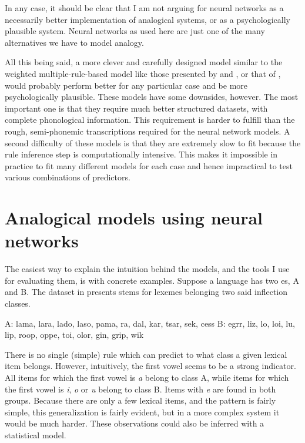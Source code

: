 In any case, it should be clear that I am not arguing for neural networks as a necessarily better implementation of analogical systems, or as a psychologically plausible system. Neural networks as used here are just one of the many alternatives we have to model analogy.

All this being said, a more clever and carefully designed model similar to the weighted multiple-rule-based model like those presented by \textcite{Albright.2003} and \textcite{Albright.2009}, or that of \textcite{Beniamine.2016}, would probably perform better for any particular case and be more psychologically plausible. These models have some downsides, however. The most important one is that they require much better structured datasets, with complete phonological information. This requirement is harder to fulfill than the rough, semi-phonemic transcriptions required for the neural network models. A second difficulty of these models is that they are extremely slow to fit because the rule inference step is computationally intensive. This makes it impossible in practice to fit many different models for each case and hence impractical to test various combinations of predictors.

\section{Analogical models using neural networks}

The easiest way to explain the intuition behind the models, and the tools I use for evaluating them, is with concrete examples. Suppose a language has two es, A and B. The dataset in  presents stems for lexemes belonging two said inflection classes.

\begin{exe}
    \ex  \label{exe-inflect-1}
    \begin{xlist}
        \ex A: lama, lara, lado, laso, pama, ra, dal, kar, tsar, sek, cess
        \ex B: egrr, liz, lo, loi, lu, lip, roop, oppe, toi, olor, gin, grip, wik
    \end{xlist}
\end{exe}

There is no single (simple) rule which can predict to what class a given lexical item belongs. However, intuitively, the first vowel seems to be a strong indicator. All items for which the first vowel is \textit{a} belong to class A, while items for which the first vowel is \textit{i}, \textit{o} or \textit{u} belong to class B. Items with \textit{e} are found in both groups. Because there are only a few lexical items, and the pattern is fairly simple, this generalization is fairly evident, but in a more complex system it would be much harder. These observations could also be inferred with a statistical model.


